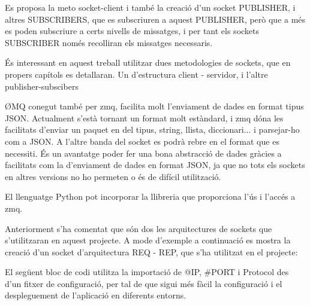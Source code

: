 \documentclass[letterpaper,11pt,catalan]{sphinxmanual}
\begin{document}
Es proposa la meto socket-client i també la creació d'un socket PUBLISHER, i
altres SUBSCRIBERS, que es subscriuren a aquest PUBLISHER, però que a més es poden subscriure
a certs nivells de missatges, i per tant els sockets SUBSCRIBER només recolliran els
missatges necessaris.

És interessant en aquest treball utilitzar dues metodologies de sockets, que en propers
capítols es detallaran.
Un d'estructura client - servidor, i l'altre publisher-subscibers


ØMQ conegut també per zmq, facilita molt l'enviament de dades en format tipus JSON. Actualment s'està tornant
un format molt estàndard, i zmq dóna les facilitats d'enviar un paquet en del tipus, string,
llista, diccionari... i parsejar-ho com a JSON. A l'altre banda del socket es podrà rebre
en el format que es necessiti. És un avantatge poder fer una bona abstracció de dades
gràcies a facilitats com la d'enviament de dades en format JSON, ja que no tots els sockets
en altres versions no ho permeten o és de difícil utilització.

El llenguatge Python pot incorporar la llibreria  que proporciona l'ús i l'accés
a zmq.

Anteriorment s'ha comentat que són dos les arquitectures de sockets que s'utilitzaran en
aquest projecte. A mode d'exemple a continuació es mostra la creació d'un socket 
d'arquitectura REQ - REP, que s'ha utilitzat en el projecte:

 El següent bloc de codi utilitza la importació de @IP, \#PORT i Protocol des d'un
fitxer de configuració, per tal de que sigui més fàcil la configuració i el despleguement de
l'aplicació en diferents entorns.
\end{document}
